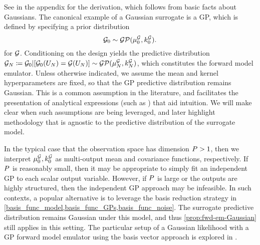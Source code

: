 \documentclass[12pt]{article}
\begin{document}
See  in the appendix for the derivation, which follows from basic facts about Gaussians.
The canonical example of a Gaussian surrogate is a GP, which is defined by specifying a prior distribution  
\begin{equation}
\fwdPrior \sim \GP(\emMeanPrior{\fwd}, \emKerPrior{\fwd}).
\end{equation}
for $\fwd$. Conditioning on the design yields the predictive distribution 
$\fwdEm[\Ndesign]  \Def \fwdPrior|[\fwdPrior(\designIn) = \fwd(\designIn)] \sim \GP(\emMean[\Ndesign]{\fwd}, \emKer[\Ndesign]{\fwd})$, 
which constitutes the forward model emulator.
Unless otherwise indicated, we assume the mean and kernel hyperparameters are
fixed, so that the GP predictive distribution remains Gaussian. This is a common assumption in the literature, 
and facilitates the presentation of analytical expressions (such as )
that aid intuition. We will make clear when such assumptions are being 
leveraged, and later highlight methodology that is agnostic to the predictive distribution of the surrogate model.

In the typical case that the observation space has dimension $\dimObs > 1$, then we interpret 
$\emMeanPrior{\fwd}, \emKerPrior{\fwd}$ as multi-output mean and covariance functions, respectively.
If $\dimObs$ is reasonably small, then it may be appropriate to simply fit an independent GP to 
each scalar output variable. However, if $\dimObs$ is large or the outputs are highly structured, 
then the independent GP approach may be infeasible.  
In such contexts, a popular 
alternative is to leverage the basis reduction strategy in \cref{basis_func_model,basis_func_GPs,basis_func_noise}.
The surrogate predictive distribution remains Gaussian under this model, and thus \cref{prop:fwd-em-Gaussian} still applies in this setting. The particular setup of a Gaussian likelihood with a GP forward model emulator using the basis vector approach is explored in \citet{Surer2023sequential}. 
\end{document}
